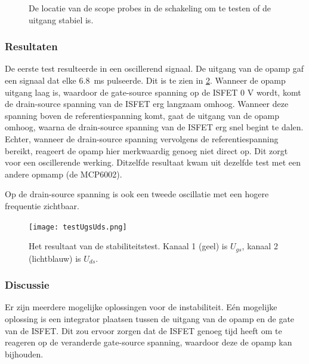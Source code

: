 \begin{figure}[!htbp]
    \centering
    \def\svgwidth{0.75\textwidth}
    
    \caption{De locatie van de scope probes in de schakeling om te testen of de uitgang stabiel is.}
    \label{fig:test ISFET circuit best}
\end{figure}


\subsubsection{Resultaten} \label{sec:stabilityTestResults}

De eerste test resulteerde in een oscillerend signaal. De uitgang van de opamp gaf een signaal dat elke \qty{6.8}{\milli\second} pulseerde. Dit is te zien in \cref{fig:resultUgsUds}.
Wanneer de opamp uitgang laag is, waardoor de gate-source spanning op de ISFET 0 V wordt, komt de drain-source spanning van de ISFET erg langzaam omhoog. Wanneer deze spanning boven de referentiespanning komt, gaat de uitgang van de opamp omhoog, waarna de drain-source spanning van de ISFET erg snel begint te dalen. Echter, wanneer de drain-source spanning vervolgens de referentiespanning bereikt, reageert de opamp hier merkwaardig genoeg niet direct op. Dit zorgt voor een oscillerende werking. Ditzelfde resultaat kwam uit dezelfde test met een andere opmamp (de MCP6002).

Op de drain-source spanning is ook een tweede oscillatie met een hogere frequentie zichtbaar.



%


\begin{figure}[!htbp]
    \centering
    \def\svgwidth{0.75\textwidth}
    \texttt{[image: testUgsUds.png]}
    \caption{Het resultaat van de stabiliteitstest. Kanaal 1 (geel) is $U_{gs}$, kanaal 2 (lichtblauw) is $U_{ds}$.}
    \label{fig:resultUgsUds}
\end{figure}


\subsubsection{Discussie}
Er zijn meerdere mogelijke oplossingen voor de instabiliteit.
Eén mogelijke oplossing is een integrator plaatsen tussen de uitgang van de opamp en de gate van de ISFET. Dit zou ervoor zorgen dat de ISFET genoeg tijd heeft om te reageren op de veranderde gate-source spanning, waardoor deze de opamp kan bijhouden.

